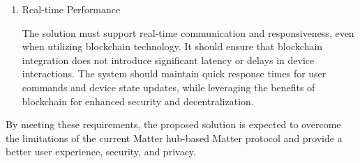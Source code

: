 \documentclass[conference]{IEEEtran}
\begin{document}
\begin{enumerate}[itemsep=2ex, parsep=1ex]
	\item Real-time Performance
	      	      
	      The solution must support real-time communication and responsiveness, even
	      when utilizing blockchain technology. It should ensure that blockchain
	      integration does not introduce significant latency or delays in device
	      interactions. The system should maintain quick response times for user commands
	      and device state updates, while leveraging the benefits of blockchain for
	      enhanced security and decentralization.
	      	                  
\end{enumerate}
            
By meeting these requirements, the proposed solution is expected to overcome
the limitations of the current Matter hub-based Matter protocol and provide
a better user experience, security, and privacy.
\end{document}
